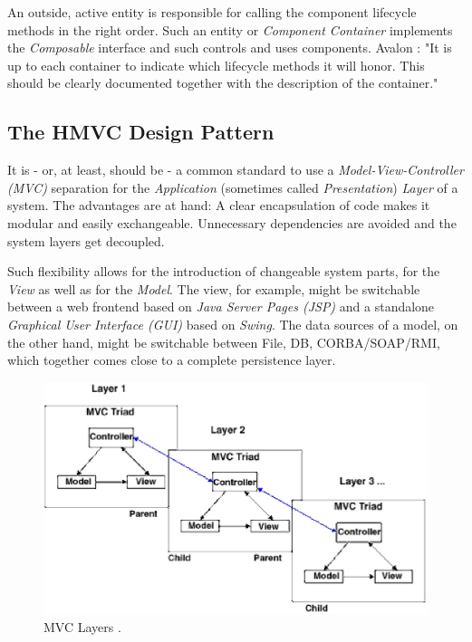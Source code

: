 \documentclass[a4paper,10pt]{llncs}
\begin{document}
An outside, active entity is responsible for calling the component lifecycle
methods in the right order. Such an entity or \emph{Component Container} implements
the \emph{Composable} interface and such controls and uses components.
Avalon \cite{jakarta}: "It is up to each container to indicate which lifecycle methods it will honor.
This should be clearly documented together with the description of the container."

\subsection{The HMVC Design Pattern}

It is - or, at least, should be - a common standard to use a \emph{Model-View-Controller (MVC)}
separation for the \emph{Application} (sometimes called \emph{Presentation}) \emph{Layer} of a system.
The advantages are at hand: A clear encapsulation of code makes it modular and easily exchangeable.
Unnecessary dependencies are avoided and the system layers get decoupled.

Such flexibility allows for the introduction of changeable system parts, for the \emph{View} as well as
for the \emph{Model}. The view, for example, might be switchable between a web frontend based on
\emph{Java Server Pages (JSP)} and a standalone \emph{Graphical User Interface (GUI)} based on \emph{Swing}.
The data sources of a model, on the other hand, might be switchable between File, DB, CORBA/SOAP/RMI,
which together comes close to a complete persistence layer.

\begin{figure}[ht]
\begin{center}
\includegraphics[scale=0.4]{mvc_layers_cai}
\caption{MVC Layers \cite{cai}.}
\label{fig:mvc_layers_cai}
\end{center}
\end{figure}
\end{document}
